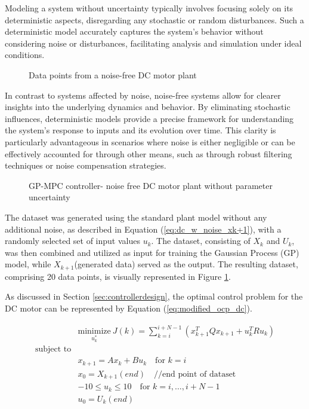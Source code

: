 Modeling a system without uncertainty typically involves focusing solely on its deterministic aspects, disregarding any stochastic or random disturbances. Such a deterministic model accurately captures the system's behavior without considering noise or disturbances, facilitating analysis and simulation under ideal conditions.

\begin{figure}
    \centering
    
    \caption{Data points from a noise-free DC motor plant}
    \label{fig:data_points_wo_noise}
\end{figure}

In contrast to systems affected by noise, noise-free systems allow for clearer insights into the underlying dynamics and behavior. By eliminating stochastic influences, deterministic models provide a precise framework for understanding the system's response to inputs and its evolution over time. This clarity is particularly advantageous in scenarios where noise is either negligible or can be effectively accounted for through other means, such as through robust filtering techniques or noise compensation strategies.

\begin{figure}
    \centering
    
    \caption{GP-MPC controller- noise free DC motor plant without parameter uncertainty}
    \label{fig:GPMPC_DC_wo_noise}
\end{figure}

The dataset was generated using the standard plant model without any additional noise, as described in Equation (\ref{eq:dc_w_noise_xk+1}), with a randomly selected set of input values $u_k$. The dataset, consisting of $X_k$ and $U_k$, was then combined and utilized as input for training the Gaussian Process (GP) model, while $X_{k+1}$(generated data) served as the output. The resulting dataset, comprising 20 data points, is visually represented in Figure \ref{fig:data_points_wo_noise}.

As discussed in Section \ref{sec:controllerdesign}, the optimal control problem for the DC motor can be represented by Equation (\ref{eq:modified_ocp_dc}).

\begin{equation} \label{eq:modified_ocp_dc}
    \begin{aligned}
 & \underset{u^*_k}{\text{minimize}} \ J(k) = \sum_{k=i}^{i+N-1}( x_{k+1}^T Q x_{k+1} + u_k^T R u_k )  \\
 \text{subject to}\\
& x_{k+1} =  A x_k + B u_k \quad \text{for } k=i \\
& x_0 = X_{k+1}(end) \quad  \text{//end point of dataset} \\
& -10 \leq u_k \leq 10 \quad \text{for } k=i,\ldots,i+N-1 \\
& u_0 = U_k(end) \\
\end{aligned}
\end{equation}

